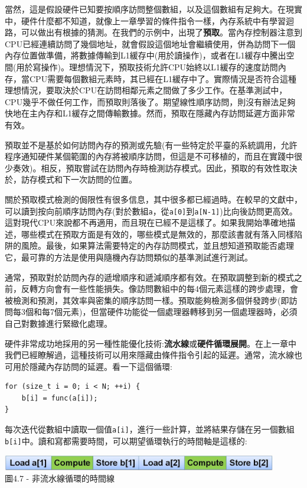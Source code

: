 當然，這是假設硬件已知要按順序訪問整個數組，以及這個數組有足夠大。在現實中，硬件什麼都不知道，就像上一章學習的條件指令一樣，內存系統中有學習迴路，可以做出有根據的猜測。在我們的示例中，出現了\textbf{預取}。當內存控制器注意到CPU已經連續訪問了幾個地址，就會假設這個地址會繼續使用，併為訪問下一個內存位置做準備，將數據傳輸到L1緩存中(用於讀操作)，或者在L1緩存中騰出空間(用於寫操作)。理想情況下，預取技術允許CPU始終以L1緩存的速度訪問內存，當CPU需要每個數組元素時，其已經在L1緩存中了。實際情況是否符合這種理想情況，要取決於CPU在訪問相鄰元素之間做了多少工作。在基準測試中，CPU幾乎不做任何工作，而預取則落後了。期望線性順序訪問，則沒有辦法足夠快地在主內存和L1緩存之間傳輸數據。然而，預取在隱藏內存訪問延遲方面非常有效。

預取並不是基於如何訪問內存的預測或先驗(有一些特定於平臺的系統調用，允許程序通知硬件某個範圍的內存將被順序訪問，但這是不可移植的，而且在實踐中很少奏效)。相反，預取嘗試在訪問內存時檢測訪存模式。因此，預取的有效性取決於，訪存模式和下一次訪問的位置。

關於預取模式檢測的侷限性有很多信息，其中很多都已經過時。在較早的文獻中，可以讀到按向前順序訪問內存(對於數組\texttt{a}，從\texttt{a[0]}到\texttt{a[N-1]})比向後訪問更高效。這對現代CPU來說都不再適用，而且現在已經不是這樣了。如果我開始準確地描述，哪些模式在預取方面是有效的，哪些模式是無效的，那麼該書就有落入同樣陷阱的風險。最後，如果算法需要特定的內存訪問模式，並且想知道預取能否處理它，最可靠的方法是使用與隨機內存訪問類似的基準測試進行測試。

通常，預取對於訪問內存的遞增順序和遞減順序都有效。在預取調整到新的模式之前，反轉方向會有一些性能損失。像訪問數組中的每4個元素這樣的跨步處理，會被檢測和預測，其效率與密集的順序訪問一樣。預取能夠檢測多個併發跨步(即訪問每3個和每7個元素)，但當硬件功能從一個處理器轉移到另一個處理器時，必須自己對數據進行緊緻化處理。

硬件非常成功地採用的另一種性能優化技術:\textbf{流水線}或\textbf{硬件循環展開}。在上一章中我們已經瞭解過，這種技術可以用來隱藏由條件指令引起的延遲。通常，流水線也可用於隱藏內存訪問的延遲。看一下這個循環:

\begin{lstlisting}[style=styleCXX]
for (size_t i = 0; i < N; ++i) {
	b[i] = func(a[i]);
}
\end{lstlisting}

每次迭代從數組中讀取一個值\texttt{a[i]}，進行一些計算，並將結果存儲在另一個數組\texttt{b[i]}中。讀和寫都需要時間，可以期望循環執行的時間軸是這樣的:

\begin{center}
\includegraphics[width=0.9\textwidth]{content/1/chapter4/images/7.jpg}\\
圖4.7 - 非流水線循環的時間線
\end{center}

